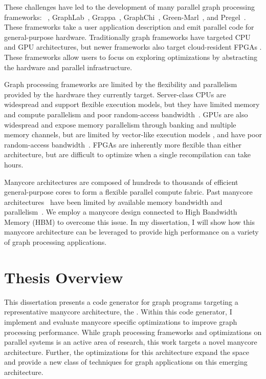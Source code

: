 These challenges have led to the development of many parallel graph processing frameworks: \graphit~\cite{zhang2018graphit,brahmakshatriya2021compiling,zhang2019optimizing}, GraphLab~\cite{low2010graphlab, low2012distributed}, Grappa~\cite{nelson2015grappa}, GraphChi~\cite{aapo2012graphchi}, Green-Marl~\cite{hong2012green}, and Pregel~\cite{malewicz2010pregel}. 
These frameworks take a user application description and emit parallel code for general-purpose hardware.
Traditionally graph frameworks have targeted CPU and GPU architectures, but newer frameworks also target cloud-resident FPGAs \cite{engelhardt2016gravf, dai2016fpgp}.
These frameworks allow users to focus on exploring optimizations by abstracting the hardware and parallel infrastructure.

Graph processing frameworks are limited by the flexibility and parallelism provided by the hardware they currently target.
Server-class CPUs are widespread and support flexible execution models, but they have limited memory and compute parallelism and poor random-access bandwidth~\citep{beamer2015locality}.
GPUs are also widespread and expose memory parallelism through banking and multiple memory channels, but are limited by vector-like execution models \cite{xu2014graph, shi2018graph}, and have poor random-access bandwidth~\citep{aamodt2018general}.
FPGAs are inherently more flexible than either architecture, but are difficult to optimize when a single recompilation can take hours. 
  
Manycore architectures are composed of hundreds to thousands of efficient general-purpose cores to form a flexible parallel compute fabric.
Past manycore architectures~\cite{ramey2011tilera, agathos2015parallela, gwennap2011adapteva} have been limited by available memory bandwidth and parallelism~\citep{loi2010efficient}.  We employ a manycore design connected to High Bandwidth Memory (HBM) \cite{jedec2020hbm, jouppi2017datacenter} to overcome this issue.
In my dissertation, I will show how this manycore architecture can be leveraged to provide high performance on a variety of graph processing applications.


\section{Thesis Overview}
This dissertation presents a code generator for graph programs targeting a representative manycore architecture, the \hbmc. 
Within this code generator, I implement and evaluate manycore specific optimizations to improve graph processing performance. 
While graph processing frameworks and optimizations on parallel systems is an active area of research, this work targets a novel manycore architecture.
Further, the optimizations for this architecture expand the space and provide a new class of techniques for graph applications on this emerging architecture. 

